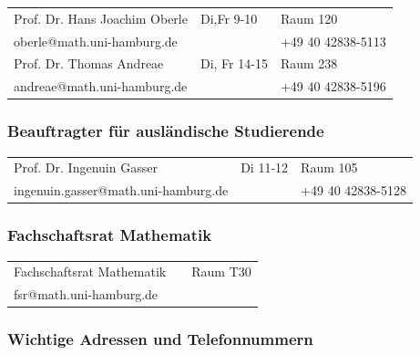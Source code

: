 \begin{tabularx}{\textwidth}{|X|X|X|}
\hline Prof. Dr. Hans Joachim Oberle&Di,Fr \hfill 9-10&Raum 120\\
       oberle@math.uni-hamburg.de&&+49 40 42838-5113\\
\hline Prof. Dr. Thomas Andreae&Di, Fr \hfill 14-15&Raum 238\\
       andreae@math.uni-hamburg.de&&+49 40 42838-5196\\
\hline
\end{tabularx}

\subsubsection{Beauftragter für ausländische Studierende}

\begin{tabularx}{\textwidth}{|X|X|X|}
\hline Prof. Dr. Ingenuin Gasser&Di \hfill 11-12&Raum 105\\
       ingenuin.gasser@math.uni-hamburg.de&&+49 40 42838-5128\\
\hline
\end{tabularx}

\subsubsection{Fachschaftsrat Mathematik}

\begin{tabularx}{\textwidth}{|X|X|X|}
\hline Fachschaftsrat Mathematik&&Raum T30\\
       fsr@math.uni-hamburg.de&&\\
\hline
\end{tabularx}

\subsubsection{Wichtige Adressen und Telefonnummern}

